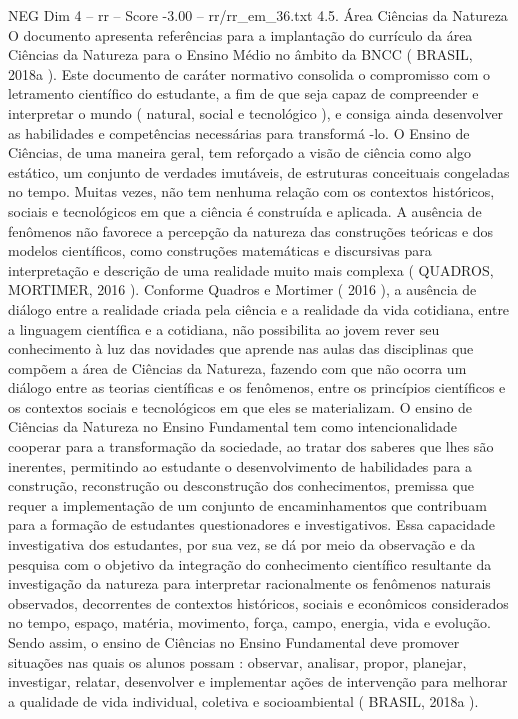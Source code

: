 \begin{textsample}{NEG Dim 4 – rr – Score -3.00 – rr/rr\_em\_36.txt}  \label{ex:f4_neg_173}
4.5.
Área Ciências da Natureza O documento apresenta referências para a implantação do currículo da área Ciências da Natureza para o Ensino Médio no âmbito da BNCC ( BRASIL, 2018a ).
Este documento de caráter normativo consolida o compromisso com o letramento científico do estudante, a fim de que seja capaz de compreender e interpretar o mundo ( natural, social e tecnológico ), e consiga ainda desenvolver as habilidades e competências necessárias para transformá -lo.
O Ensino de Ciências, de uma maneira geral, tem reforçado a visão de ciência como algo estático, um conjunto de verdades imutáveis, de estruturas conceituais congeladas no tempo.
Muitas vezes, não tem nenhuma relação com os contextos históricos, sociais e tecnológicos em que a ciência é construída e aplicada.
A ausência de fenômenos não favorece a percepção da natureza das construções teóricas e dos modelos científicos, como construções matemáticas e discursivas para interpretação e descrição de uma realidade muito mais complexa ( QUADROS, MORTIMER, 2016 ).
Conforme Quadros e Mortimer ( 2016 ), a ausência de diálogo entre a realidade criada pela ciência e a realidade da vida cotidiana, entre a linguagem científica e a cotidiana, não possibilita ao jovem rever seu conhecimento à luz das novidades que aprende nas aulas das disciplinas que compõem a área de Ciências da Natureza, fazendo com que não ocorra um diálogo entre as teorias científicas e os fenômenos, entre os princípios científicos e os contextos sociais e tecnológicos em que eles se materializam.
O ensino de Ciências da Natureza no Ensino Fundamental tem como intencionalidade cooperar para a transformação da sociedade, ao tratar dos saberes que lhes são inerentes, permitindo ao estudante o desenvolvimento de habilidades para a construção, reconstrução ou desconstrução dos conhecimentos, premissa que requer a implementação de um conjunto de encaminhamentos que contribuam para a formação de estudantes questionadores e investigativos.
Essa capacidade investigativa dos estudantes, por sua vez, se dá por meio da observação e da pesquisa com o objetivo da integração do conhecimento científico resultante da investigação da natureza para interpretar racionalmente os fenômenos naturais observados, decorrentes de contextos históricos, sociais e econômicos considerados no tempo, espaço, matéria, movimento, força, campo, energia, vida e evolução.
Sendo assim, o ensino de Ciências no Ensino Fundamental deve promover situações nas quais os alunos possam : observar, analisar, propor, planejar, investigar, relatar, desenvolver e implementar ações de intervenção para melhorar a qualidade de vida individual, coletiva e socioambiental ( BRASIL, 2018a ).

\end{textsample}
